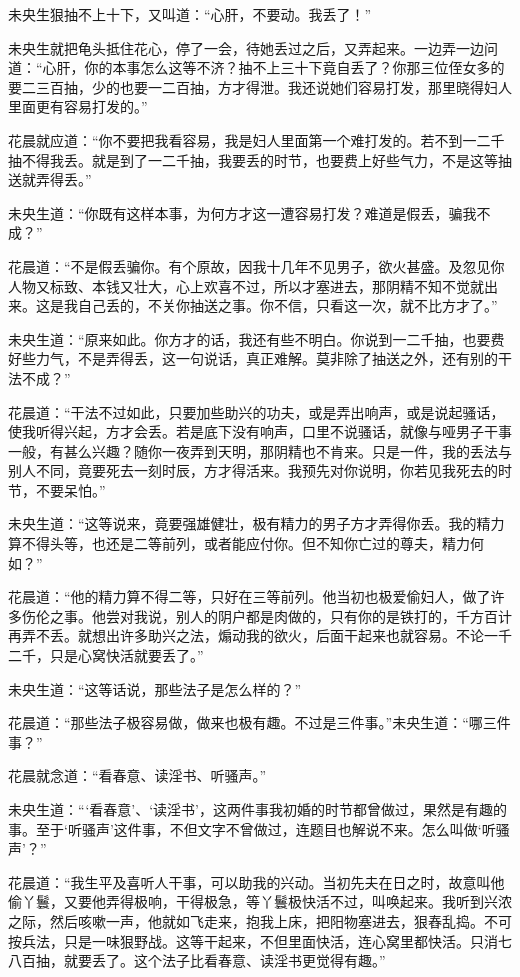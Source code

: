 \documentclass[a4paper,12pt,UTF8,twoside]{ctexbook}
\begin{document}
未央生狠抽不上十下，又叫道：“心肝，不要动。我丢了！”

未央生就把龟头抵住花心，停了一会，待她丢过之后，又弄起来。一边弄一边问道：“心肝，你的本事怎么这等不济？抽不上三十下竟自丢了？你那三位侄女多的要二三百抽，少的也要一二百抽，方才得泄。我还说她们容易打发，那里晓得妇人里面更有容易打发的。”

花晨就应道：“你不要把我看容易，我是妇人里面第一个难打发的。若不到一二千抽不得我丢。就是到了一二千抽，我要丢的时节，也要费上好些气力，不是这等抽送就弄得丢。”

未央生道：“你既有这样本事，为何方才这一遭容易打发？难道是假丢，骗我不成？”

花晨道：“不是假丢骗你。有个原故，因我十几年不见男子，欲火甚盛。及忽见你人物又标致、本钱又壮大，心上欢喜不过，所以才塞进去，那阴精不知不觉就出来。这是我自己丢的，不关你抽送之事。你不信，只看这一次，就不比方才了。”

未央生道：“原来如此。你方才的话，我还有些不明白。你说到一二千抽，也要费好些力气，不是弄得丢，这一句说话，真正难解。莫非除了抽送之外，还有别的干法不成？”

花晨道：“干法不过如此，只要加些助兴的功夫，或是弄出响声，或是说起骚话，使我听得兴起，方才会丢。若是底下没有响声，口里不说骚话，就像与哑男子干事一般，有甚么兴趣？随你一夜弄到天明，那阴精也不肯来。只是一件，我的丢法与别人不同，竟要死去一刻时辰，方才得活来。我预先对你说明，你若见我死去的时节，不要呆怕。”

未央生道：“这等说来，竟要强雄健壮，极有精力的男子方才弄得你丢。我的精力算不得头等，也还是二等前列，或者能应付你。但不知你亡过的尊夫，精力何如？”

花晨道：“他的精力算不得二等，只好在三等前列。他当初也极爱偷妇人，做了许多伤伦之事。他尝对我说，别人的阴户都是肉做的，只有你的是铁打的，千方百计再弄不丢。就想出许多助兴之法，煽动我的欲火，后面干起来也就容易。不论一千二千，只是心窝快活就要丢了。”

未央生道：“这等话说，那些法子是怎么样的？”

花晨道：“那些法子极容易做，做来也极有趣。不过是三件事。”未央生道：“哪三件事？”

花晨就念道：“看春意、读淫书、听骚声。”

未央生道：“‘看春意’、‘读淫书’，这两件事我初婚的时节都曾做过，果然是有趣的事。至于‘听骚声’这件事，不但文字不曾做过，连题目也解说不来。怎么叫做‘听骚声’？”

花晨道：“我生平及喜听人干事，可以助我的兴动。当初先夫在日之时，故意叫他偷丫鬟，又要他弄得极响，干得极急，等丫鬟极快活不过，叫唤起来。我听到兴浓之际，然后咳嗽一声，他就如飞走来，抱我上床，把阳物塞进去，狠舂乱捣。不可按兵法，只是一味狠野战。这等干起来，不但里面快活，连心窝里都快活。只消七八百抽，就要丢了。这个法子比看春意、读淫书更觉得有趣。”
\end{document}
